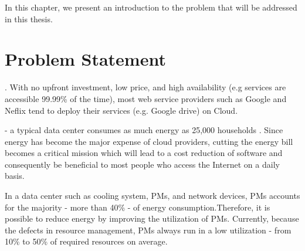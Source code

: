In this chapter, we present an introduction to the problem that will be addressed in this thesis. 

\section{Problem Statement}

. With no upfront investment, low price, and high availability (e.g services are accessible 99.99\% of the time), most web service providers such as Google and Neflix tend to deploy their services (e.g. Google drive) on Cloud. 

 - a typical data center consumes as much energy as 25,000 households \cite{Dayarathna:2016ua}. Since energy has become the major expense of cloud providers, cutting the energy bill becomes a critical mission which will lead to a cost reduction of software and consequently be beneficial to most people who access the Internet on a daily basis.

 In a data center such as cooling system, PMs, and network devices, PMs accounts for the majority - more than 40\% - of energy consumption.Therefore, it is possible to reduce energy by improving the utilization of PMs. Currently, because the defects in resource management, PMs always run in a low utilization \cite{Barroso:2007jt, Shen:2015hm} - from 10\% to 50\% of required resources on average.



